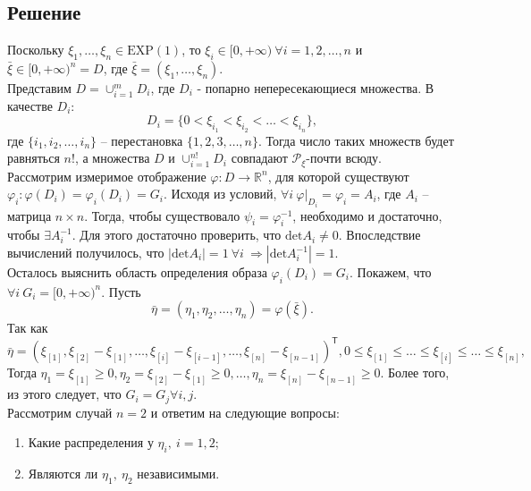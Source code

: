 \documentclass[specialist,
substylefile = spbu_report.rtx,
subf,href,colorlinks=true, 12pt]{disser}
\newcommand{\R}{\mathbb{R}}
\begin{document}
	\subsection{Решение}
	Поскольку $\xi_1,\dots,\xi_n\in \mathrm{EXP}(1)$, то $\xi_i\in [0,+\infty) ~\forall i=1,2,\dots,n$ и $\bar{\xi}\in [0,+\infty)^n=D$, где $\bar{\xi}=(\xi_1,\dots,\xi_n)$.\\
	Представим $D = \cup_{i=1}^m D_i$, где $D_i$ - попарно непересекающиеся множества. В качестве $D_i$:
	\begin{equation*}
		D_i = \{0<\xi_{i_1}<\xi_{i_2}<\dots<\xi_{i_n}\},
	\end{equation*}
	где $\{i_1,i_2,\dots,i_n\}$ -- перестановка $\{1,2,3,\dots,n\}$. Тогда число таких множеств будет равняться $n!$, а множества $D$ и $\cup_{i=1}^{n!}D_i$ совпадают $\mathcal{P}_{\xi}$-почти всюду.\\
	Рассмотрим измеримое отображение $\varphi:D\rightarrow\R^n$, для которой существуют $\varphi_i: \varphi(D_i)=\varphi_i(D_i)=G_i$. Исходя из условий, $\forall i~\varphi|_{D_i}=\varphi_i=A_i$, где $A_i$ -- матрица $n\times n$. Тогда, чтобы существовало $\psi_i = \varphi_i^{-1}$, необходимо и достаточно, чтобы $\exists A_i^{-1}$. Для этого достаточно проверить, что $\mathrm{det}A_i\neq0$. Впоследствие вычислений получилось, что $|\mathrm{det}A_i|=1~\forall i~\Rightarrow|\mathrm{det}A_i^{-1}|=1$.\\
	Осталось выяснить область определения образа $\varphi_i(D_i) = G_i$. Покажем, что $\forall i~G_i=[0,+\infty)^n$. Пусть
	\begin{equation*}
		\bar{\eta}=(\eta_1,\eta_2,\dots,\eta_n) = \varphi(\bar{\xi}).
	\end{equation*}
	Так как
	\begin{equation*}
		\bar{\eta}=(\xi_{[1]},\xi_{[2]}-\xi_{[1]},\dots,\xi_{[i]}-\xi_{[i-1]},\dots,\xi_{[n]}-\xi_{[n-1]})^\mathsf{T}, 0\leqslant\xi_{[1]}\leqslant\dots\leqslant\xi_{[i]}\leqslant\dots\leqslant\xi_{[n]},
	\end{equation*}
	Тогда $\eta_1=\xi_{[1]}\geqslant0, \eta_2=\xi_{[2]}-\xi_{[1]}\geqslant0,\dots,\eta_n=\xi_{[n]}-\xi_{[n-1]}\geqslant0$. Более того, из этого следует, что $G_i=G_j \forall i,j$. 
	\\Рассмотрим случай $n=2$ и ответим на следующие вопросы:
	\begin{enumerate}
		\item Какие распределения у $\eta_i,~i=1,2$;
		\item Являются ли $\eta_1,~\eta_2$ независимыми.
	\end{enumerate}
\end{document}
